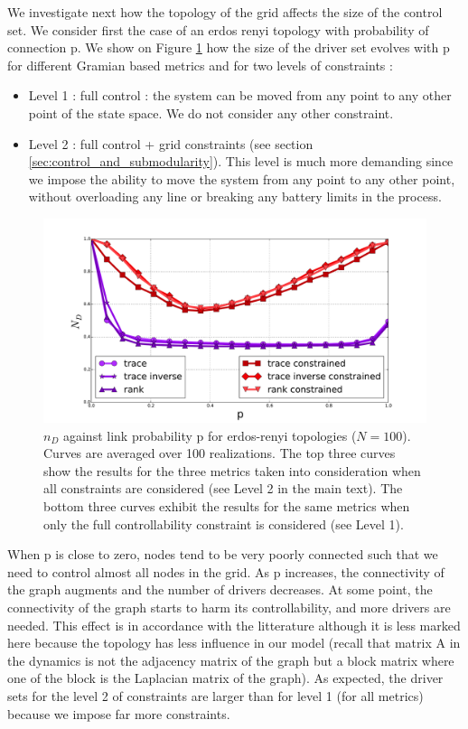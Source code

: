 \documentclass[conference]{IEEEtran}
\begin{document}
We investigate next how the topology of the grid affects the size of the control set. We consider first the case of an erdos renyi topology with probability of connection p. We show on Figure \ref{fig:erdos_renyi} how the size of the driver set evolves with p for different Gramian based metrics and for two levels of constraints : 

\begin{itemize}
\item Level 1 : full control : the system can be moved from any point to any other point of the state space. We do not consider any other constraint. 
\item Level 2 : full control + grid constraints (see section \ref{sec:control_and_submodularity}). This level is much more demanding since we impose the ability to move the system from any point to any other point, without overloading any line or breaking any battery limits in the process.
\end{itemize}

\begin{figure}
\includegraphics[scale=.25]{./figure_4/figure_4}
\caption{ $ n_D $ against link probability p for erdos-renyi topologies ($ N=100 $). Curves are averaged over 100 realizations. The top three curves show the results for the three metrics taken into consideration when all constraints are considered (see Level 2 in the main text). The bottom three curves exhibit the results for the same metrics when only the full controllability constraint is considered (see Level 1).}
\label{fig:erdos_renyi}
\end{figure}


When p is close to zero, nodes tend to be very poorly connected such that we need to control almost all nodes in the grid. As p increases, the connectivity of the graph augments and the number of drivers decreases. At some point, the connectivity of the graph starts to harm its controllability, and more drivers are needed. This effect is in accordance with the litterature although it is less marked here because the topology has less influence in our model (recall that matrix A in the dynamics is not the adjacency matrix of the graph but a block matrix where one of the block is the Laplacian matrix of the graph). As expected, the driver sets for the level 2 of constraints are larger than for level 1 (for all metrics) because we impose far more constraints.
\end{document}
